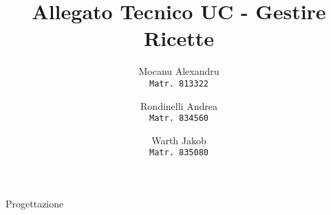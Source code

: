 \documentclass[14pt]{extarticle}
\title{Allegato Tecnico UC - Gestire Ricette}
\author{
  Mocanu Alexandru\\
  \texttt{Matr. 813322}
  \and
  Rondinelli Andrea\\
  \texttt{Matr. 834560}
  \and
  Warth Jakob\\
  \texttt{Matr. 835080}
}
\date{}
\begin{document}
\maketitle
\centering
\vspace{\fill}
\Huge{Progettazione}
\end{document}
